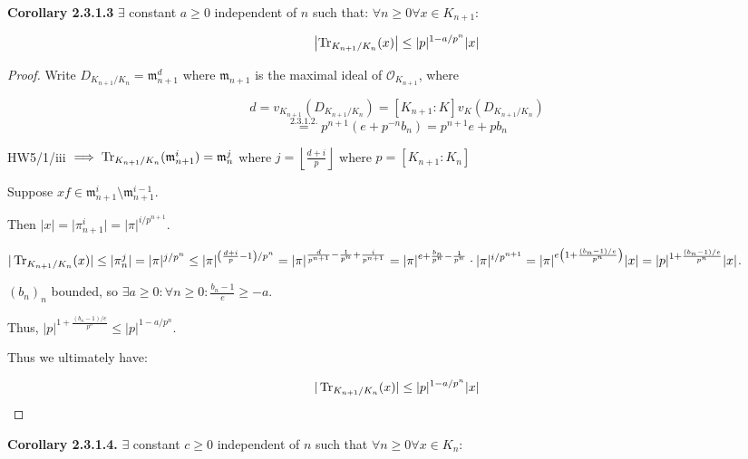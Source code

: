 \documentclass{article}
\theoremstyle{definition}
\numberwithin{theorem}{subsection}
\begin{document}
    \textbf{Corollary 2.3.1.3} \(\exists\) constant \(a\geq 0\) independent of \(n\) such that: \(\forall n \geq 0 \forall x \in K_{n+1}:\) 

    \[
        \left\vert \Tr_{K_{n+1} / K_n}(x) \right\vert \leq \vert p \vert ^ {1 - a / p^n} \vert x \vert 
    \]

    \begin{proof}
        Write \(D_{K_{n+1} / K_n} = \mathfrak{m}_{n+1}^d\) where \(\mathfrak{m}_{n+1}\) is the maximal ideal of \(\mathcal{O}_{K_{n+1}}\), where

        \[
            d = v_{K_{n+1}} (D_{K_{n+1} / K_n}) = [K_{n+1} : K] v_K (D_{K_{n+1} / K_n})
        \]
        \[
            \overset{2.3.1.2.}{=} p^{n+1} (e+p^{-n} b_n) = p^{n+1} e + p b_n
        \]
        
        HW5/1/iii \(\implies \Tr_{K_{n+1} / K_n}(\mathfrak{m}_{n+1}^i) = \mathfrak{m}_n^j \) where \(j = \left\lfloor \frac{d+i}{p} \right\rfloor\) where \(p = [K_{n+1} : K_n]\) 

        Suppose \(xf\in \mathfrak{m}_{n+1}^i \setminus \mathfrak{m}_{n+1}^{i-1}\).

        Then \(\vert x \vert = \vert \pi_{n+1}^i \vert = \vert \pi \vert^{i / p^{n+1}}\).
        
        \(\vert\Tr_{K_{n+1} / K_n}(x)\vert \leq \vert \pi_n^j \vert = \vert \pi \vert^{j / p^n} \leq \vert \pi \vert^{\left( \frac{d+i}{p}-1 \right) / p^n} = \vert \pi \vert ^{\frac{d}{p^{n+1}} - \frac{1}{p^n} + \frac{i}{p^{n+1}}} = \vert \pi \vert^{e + \frac{b_n}{p^n} - \frac{1}{p^n}} \cdot \vert \pi \vert^{i / p^{n+1}} = \vert \pi \vert ^{e \left( 1 + \frac{(b_n - 1) / e}{p^n} \right)} \vert x \vert = \vert p \vert^{1 + \frac{(b_n - 1) / e}{p^n}} \vert x \vert\).
        
        \((b_n)_n\) bounded, so \(\exists a \geq 0 : \forall n \geq 0: \frac{b_n - 1}{e} \geq -a\).
        
        Thus, \(\vert p \vert^{1 + \frac{(b_n - 1) / e}{p^n}} \leq \vert p \vert^{1 - a / p^n}\).
        
        Thus we ultimately have:

        \[
            \vert \Tr_{K_{n+1} / K_n}(x) \vert \leq \vert p \vert^{1 - a / p^n} \vert x \vert 
        \]
    \end{proof}

    \textbf{Corollary 2.3.1.4.} \(\exists\) constant \(c \geq 0\) independent of \(n\) such that \(\forall n \geq 0 \forall x\in K_n\):
\end{document}
